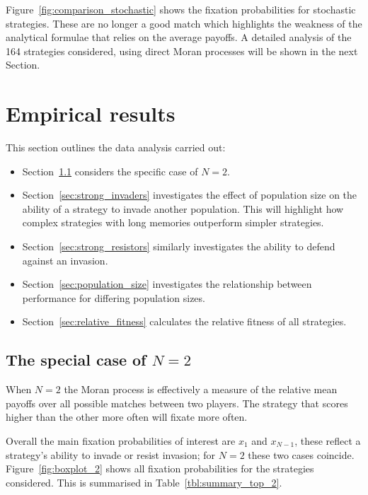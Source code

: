 \documentclass{article}
\begin{document}
Figure~\ref{fig:comparison_stochastic} shows the fixation probabilities for
stochastic strategies. These are no longer a good match which highlights the
weakness of the analytical formulae that relies on the average payoffs. A
detailed analysis of the 164 strategies considered, using direct Moran processes
will be shown in the next Section.


\section{Empirical results}\label{sec:empirical_results}


This section outlines the data analysis carried out:

\begin{itemize}
    \item Section~\ref{sec:two_individuals} considers the specific case of
        \(N=2\).
    \item Section~\ref{sec:strong_invaders} investigates the effect of
        population size on the ability of a strategy to invade another
        population. This will highlight how complex strategies with long
        memories outperform simpler strategies.
    \item Section~\ref{sec:strong_resistors} similarly investigates the
        ability to defend against an invasion.
    \item Section~\ref{sec:population_size} investigates the relationship
        between performance for differing population sizes.
    \item Section~\ref{sec:relative_fitness} calculates the relative fitness of all
        strategies.
\end{itemize}

\subsection{The special case of \(N=2\)}\label{sec:two_individuals}

When $N=2$ the Moran process is effectively a measure of the relative
mean payoffs over all possible matches between two players. The strategy
that scores higher than the other more often will fixate more often.

Overall the main fixation probabilities of interest are \(x_1\) and \(x_{N-1}\), these
reflect a strategy's ability to invade or resist invasion; for \(N=2\) these two cases
coincide. Figure~\ref{fig:boxplot_2} shows
all fixation probabilities for the strategies considered. This is summarised
in Table~\ref{tbl:summary_top_2}.
\end{document}
